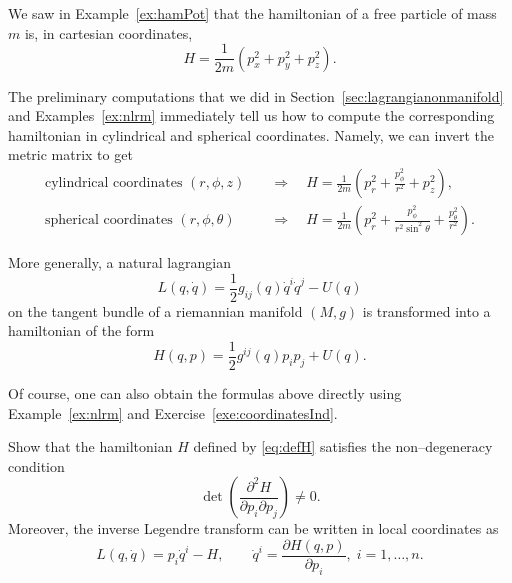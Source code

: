 \documentclass[english,fontsize=11pt,paper=a5,oneside]{scrbook}
\theoremstyle{definition}
\newenvironment{example}
  {\pushQED{\qed}\renewcommand{\qedsymbol}{$\lozenge$}\examplex}
  {\popQED\endexamplex}
\newenvironment{exercise}
  {\pushQED{\qed}\renewcommand{\qedsymbol}{$\maltese$}\exercisex}
  {\popQED\endexercisex}
\begin{document}
\begin{example}
    We saw in Example~\ref{ex:hamPot} that the hamiltonian of a free particle of mass $m$ is, in cartesian coordinates,
    \begin{equation}
        H = \frac{1}{2m}(p_x^2 + p_y^2 + p_z^2).
    \end{equation}

    The preliminary computations that we did in Section~\ref{sec:lagrangianonmanifold} and Examples~\ref{ex:nlrm} immediately tell us how to compute the corresponding hamiltonian in cylindrical and spherical coordinates.
    Namely, we can invert the metric matrix to get
    \begin{align}
        \mbox{cylindrical coordinates } (r,\phi,z) \quad&\Rightarrow\quad H = \frac 1{2m} \left(p_r^2 + \frac{p_\phi^2}{r^2} + p_z^2\right), \\
        \mbox{spherical coordinates } (r,\phi,\theta) \quad&\Rightarrow\quad H = \frac 1{2m} \left(p_r^2 + \frac{p_\phi^2}{r^2\sin^2\theta} + \frac{p_\theta^2}{r^2} \right).
    \end{align}

    More generally, a natural lagrangian
    \begin{equation}
        L(q,\dot q) = \frac 12 g_{ij}(q) \dot q^i \dot q^j - U(q)
    \end{equation}
    on the tangent bundle of a riemannian manifold $(M,g)$ is transformed into a hamiltonian of the form
    \begin{equation}
        H(q,p) = \frac 12 g^{ij}(q) p_i p_j + U(q).
    \end{equation}

    Of course, one can also obtain the formulas above directly using Example~\ref{ex:nlrm} and Exercise~\ref{exe:coordinatesInd}.
\end{example}

\begin{exercise}[Inverse Legendre transform]
    Show that the hamiltonian $H$ defined by \eqref{eq:defH} satisfies the non--degeneracy condition
    \begin{equation}
        \det\left(\frac{\partial^2 H}{\partial p_i\partial p_j}\right) \neq 0.
    \end{equation}
    Moreover, the inverse Legendre transform can be written in local coordinates as
    \begin{equation}\label{eq:inverseLegendre}
        L(q, \dot q) = p_i \dot q^i - H,\qquad
        \dot q^i = \frac{\partial H (q,p)}{\partial p_i}, \; i=1,\ldots,n.
    \end{equation}
\end{exercise}
\end{document}
